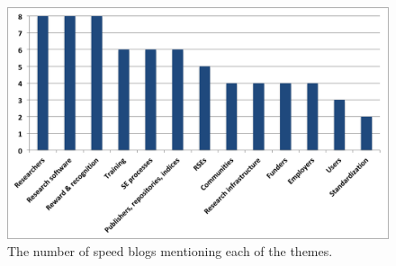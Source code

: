 \documentclass[11pt,letterpaper]{article}
\begin{document}
\begin{figure}[h!]
  \includegraphics[width=\textwidth]{speed_blogs_categories_distribution-jors.png}
  \caption{The number of speed blogs mentioning each of the themes.}
  \label{fig:speedblogs}
\end{figure}


\end{document}
